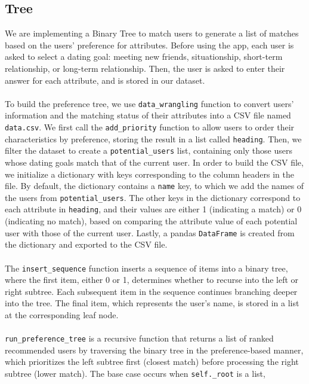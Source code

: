 \documentclass[fontsize=11pt]{article}
\begin{document}
\subsection*{Tree}
We are implementing a Binary Tree to match users to generate a list of matches based on the users’ preference for attributes.
Before using the app, each user is asked to select a dating goal: meeting new friends, situationship, short-term relationship, or long-term relationship.
Then, the user is asked to enter their answer for each attribute, and is stored in our dataset.
\\
\\
To build the preference tree, we use \texttt{data\_wrangling} function to convert users' information and the matching status 
of their attributes into a CSV file named \texttt{data.csv}. We first call the \texttt{add\_priority} function to allow users to order their characteristics 
by preference, storing the result in a list called \texttt{heading}. Then, we filter the dataset to create a \texttt{potential\_users} list, containing only 
those users whose dating goals match that of the current user. In order to build the CSV file, we initialize a dictionary with keys corresponding to the column 
headers in the file. By default, the dictionary contains a \texttt{name} key, to which we add the names of the users from \texttt{potential\_users}. The other keys in 
the dictionary correspond to each attribute in \texttt{heading}, and their values are either 1 (indicating a match) or 0 (indicating no match), based on comparing the 
attribute value of each potential user with those of the current user. Lastly, a pandas \texttt{DataFrame} is created from the dictionary and exported to the CSV file.
\\
\\
The \texttt{insert\_sequence} function inserts a sequence of items into a binary tree, where the first item, either 0 or 1, determines whether to recurse into the left or right subtree. 
Each subsequent item in the sequence continues branching deeper into the tree. The final item, which represents the user’s name, is stored in a list at the corresponding leaf node.
\\
\\
\texttt{run\_preference\_tree} is a recursive function that returns a list of ranked recommended users by traversing the binary tree in the preference-based manner, 
which prioritizes the left subtree first (closest match) before processing the right subtree (lower match). The base case occurs when \texttt{self.\_root} is a list, 
\end{document}
